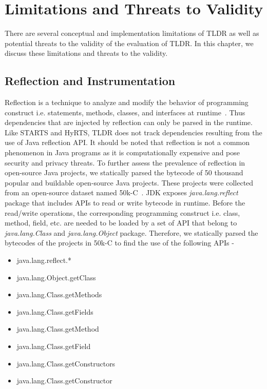 \chapter{Limitations and Threats to Validity}
\label{sec:thread}

There are several conceptual and implementation limitations of TLDR as well as potential threats to the validity of the evaluation of TLDR. In this chapter, we discuss these limitations and threats to the validity.


\section{Reflection and Instrumentation}

Reflection is a technique to analyze and modify the behavior of programming construct i.e. statements, methods, classes, and interfaces at runtime~\cite{forman2004java}. Thus dependencies that are injected by reflection can only be parsed in the runtime. Like STARTS and HyRTS, TLDR does not track dependencies resulting from the use of Java reflection API. It should be noted that reflection is not a common phenomenon in Java programs as it is computationally expensive and pose security and privacy threats. To further assess the prevalence of reflection in open-source Java projects, we statically parsed the bytecode of 50 thousand popular and buildable open-source Java projects. These projects were collected from an open-source dataset named 50k-C~\cite{martins201850k}. JDK exposes \textit{java.lang.reflect} package that includes APIs to read or write bytecode in runtime. Before the read/write operations, the corresponding programming construct i.e. class, method, field, etc. are needed to be loaded by a set of API that belong to \textit{java.lang.Class} and \textit{java.lang.Object} package. Therefore, we statically parsed the bytecodes of the projects in 50k-C to find the use of the following APIs - 
\begin{itemize}
  \item java.lang.reflect.*
  \item java.lang.Object.getClass
  \item java.lang.Class.getMethods
  \item java.lang.Class.getFields
  \item java.lang.Class.getMethod
  \item java.lang.Class.getField
  \item java.lang.Class.getConstructors
  \item java.lang.Class.getConstructor
\end{itemize}



